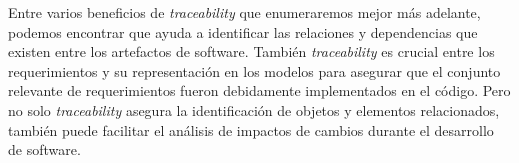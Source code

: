 \documentclass[a4paper,12pt,oneside,spanish]{book}
\begin{document}
%
%
%
%
%
%
%
%

Entre varios beneficios de \textit{traceability} que enumeraremos mejor más adelante, podemos encontrar que ayuda a identificar las relaciones y dependencias que existen entre los artefactos de software. También \textit{traceability} es crucial entre los requerimientos y su representación en los modelos para asegurar que el conjunto relevante de requerimientos fueron debidamente implementados en el código. Pero no solo \textit{traceability} asegura la identificación de objetos y elementos relacionados, también puede facilitar el análisis de impactos de cambios durante el desarrollo de software.
\end{document}
